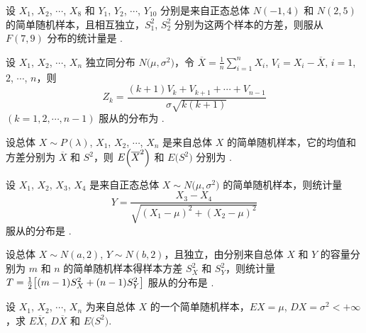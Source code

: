 	\begin{titwo}
		设 $X_{1}$, $X_{2}$, $\cdots$, $X_{8}$ 和 $Y_{1}$, $Y_{2}$, $\cdots$, $Y_{10}$ 分别是来自正态总体 $N(-1,4)$ 和 $N(2,5)$ 的简单随机样本，且相互独立，$S_{1}^{2}$, $S_{2}^{2}$ 分别为这两个样本的方差，则服从 $F(7,9)$ 分布的统计量是 \kuo.

	\end{titwo}

	\begin{titwo}
		设 $X_{1}$, $X_{2}$, $\cdots$, $X_{n}$ 独立同分布 $N\bigl( \mu,\sigma^{2} \bigr)$，令 $\overline{X} = \frac{1}{n} \sum_{i=1}^{n} X_{i}$, $V_{i} = X_{i} - \overline{X}$, $i = 1$, $2$, $\cdots$, $n$，则
		\[
			Z_{k} = \frac{(k+1)V_{k} + V_{k+1} + \cdots + V_{n-1}}{\sigma\sqrt{k(k+1)}}
		\]
		$(k = 1,2,\cdots,n-1)$ 服从的分布为 \kuo.

		\fourch{$t(n-1)$}{$N(0,1)$}{$\chi^{2}(1)$}{$F(1,1)$}
	\end{titwo}

	\begin{titwo}
		设总体 $X \sim P(\lambda)$, $X_{1}$, $X_{2}$, $\cdots$, $X_{n}$ 是来自总体 $X$ 的简单随机样本，它的均值和方差分别为 $\overline{X}$ 和 $S^{2}$，则 $E\Bigl( \overline{X}^{2} \Bigr)$ 和 $E\bigl( S^{2} \bigr)$ 分别为 \htwo.
	\end{titwo}

	\begin{titwo}
		设 $X_{1}$, $X_{2}$, $X_{3}$, $X_{4}$ 是来自正态总体 $X \sim N \bigl( \mu,\sigma^{2} \bigr)$ 的简单随机样本，则统计量
		\[
			Y = \frac{X_{3} - X_{4}}{\sqrt{ (X_{1} - \mu)^{2} + (X_{2} - \mu)^{2} }}
		\]
		服从的分布是 \htwo.
	\end{titwo}

	\begin{titwo}
		设总体 $X \sim N(a,2)$, $Y \sim N(b,2)$，且独立，由分别来自总体 $X$ 和 $Y$ 的容量分别为 $m$ 和 $n$ 的简单随机样本得样本方差 $S_{X}^{2}$ 和 $S_{Y}^{2}$，则统计量 $T = \frac{1}{2} \bigl[ (m-1) \* S_{X}^{2} + (n-1) \* S_{Y}^{2} \bigr]$ 服从的分布是 \htwo.
	\end{titwo}

	\begin{titwo}
		设 $X_{1}$, $X_{2}$, $\cdots$, $X_{n}$ 为来自总体 $X$ 的一个简单随机样本，$EX = \mu$, $DX = \sigma^{2} < +\infty$，求 $E\overline{X}$, $D\overline{X}$ 和 $E \bigl( S^{2} \bigr)$.
	\end{titwo}

